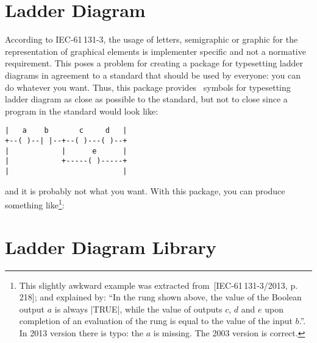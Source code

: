 \documentclass[a4paper]{ltxdoc}
\newlength{\ladderskip}
\newlength{\ladderrungsep}
\begin{document}
\section{Ladder Diagram}
According to IEC-61\,131-3, the usage of letters, semigraphic or graphic for the representation of graphical elements is implementer specific and not a normative requirement. This poses a problem for creating a package for typesetting ladder diagrams in agreement to a standard that should be used by everyone: you can do whatever you want. Thus, this package provides \tikzname\ symbols for typesetting ladder diagram as close as possible to the standard, but not to close since a program in the standard would look like:
\begin{center}
\begin{minipage}{5cm}
\begin{verbatim}
|   a    b       c     d   |
+--( )--| |--+--( )---( )--+
|            |      e      |
|            +-----( )-----+
|                          |
\end{verbatim}
\end{minipage}
\end{center}
and it is probably not what you want. With this package, you can produce something like\footnote{This slightly awkward example was extracted from~[IEC-61\,131-3/2013, p. 218]; and explained by: ``In the rung shown above, the value of the Boolean output $a$ is always |TRUE|, while the value of outputs $c$, $d$ and $e$ upon completion of an evaluation of the rung is equal to the value of the input $b$.''. In 2013 version there is typo: the $a$ is missing. The 2003 version is correct.}:

\begin{center}
\end{center}


\section{Ladder Diagram Library}
\end{document}
